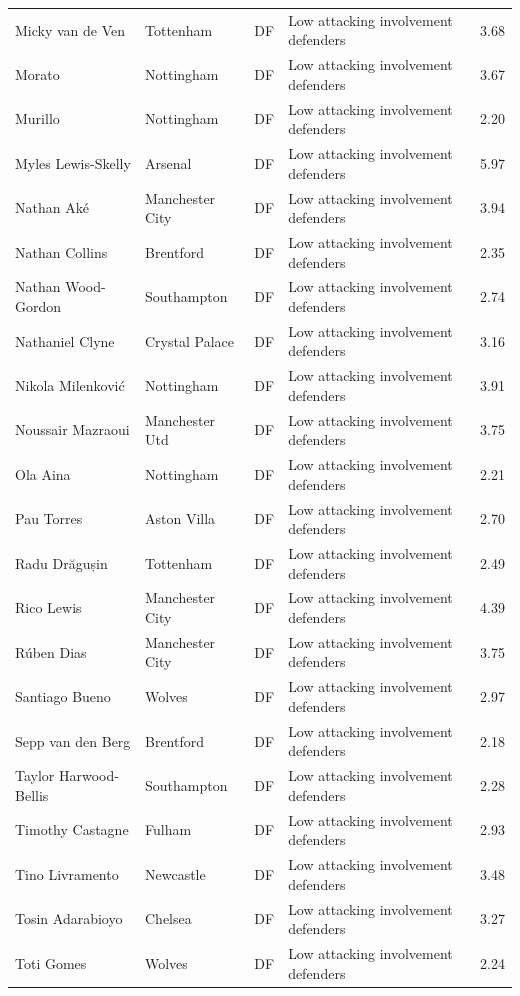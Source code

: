 \begin{longtable}{p{3.4cm}p{2.5cm}p{1.0cm}p{5.0cm}r}
Micky van de Ven & Tottenham & DF & Low attacking involvement defenders & 3.68 \\
Morato & Nottingham & DF & Low attacking involvement defenders & 3.67 \\
Murillo & Nottingham & DF & Low attacking involvement defenders & 2.20 \\
Myles Lewis-Skelly & Arsenal & DF & Low attacking involvement defenders & 5.97 \\
Nathan Aké & Manchester City & DF & Low attacking involvement defenders & 3.94 \\
Nathan Collins & Brentford & DF & Low attacking involvement defenders & 2.35 \\
Nathan Wood-Gordon & Southampton & DF & Low attacking involvement defenders & 2.74 \\
Nathaniel Clyne & Crystal Palace & DF & Low attacking involvement defenders & 3.16 \\
Nikola Milenković & Nottingham & DF & Low attacking involvement defenders & 3.91 \\
Noussair Mazraoui & Manchester Utd & DF & Low attacking involvement defenders & 3.75 \\
Ola Aina & Nottingham & DF & Low attacking involvement defenders & 2.21 \\
Pau Torres & Aston Villa & DF & Low attacking involvement defenders & 2.70 \\
Radu Drăgușin & Tottenham & DF & Low attacking involvement defenders & 2.49 \\
Rico Lewis & Manchester City & DF & Low attacking involvement defenders & 4.39 \\
Rúben Dias & Manchester City & DF & Low attacking involvement defenders & 3.75 \\
Santiago Bueno & Wolves & DF & Low attacking involvement defenders & 2.97 \\
Sepp van den Berg & Brentford & DF & Low attacking involvement defenders & 2.18 \\
Taylor Harwood-Bellis & Southampton & DF & Low attacking involvement defenders & 2.28 \\
Timothy Castagne & Fulham & DF & Low attacking involvement defenders & 2.93 \\
Tino Livramento & Newcastle & DF & Low attacking involvement defenders & 3.48 \\
Tosin Adarabioyo & Chelsea & DF & Low attacking involvement defenders & 3.27 \\
Toti Gomes & Wolves & DF & Low attacking involvement defenders & 2.24 \\

\end{longtable}
